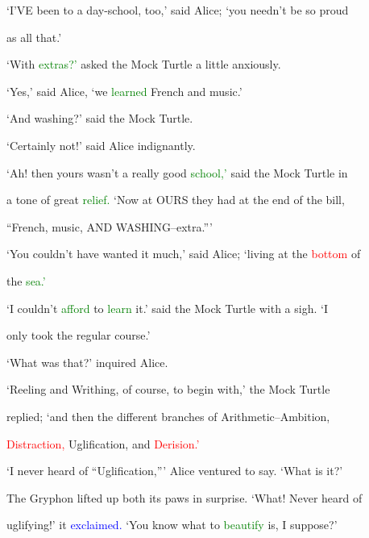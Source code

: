  ‘I’VE been to a day-school, too,’ said Alice; ‘you needn’t be so \textcolor{BurntOrange}{proud}

 as all that.’



 ‘With \textcolor{green}{extras?’} asked the Mock Turtle a little anxiously.



 ‘Yes,’ said Alice, ‘we \textcolor{green}{learned} French and \textcolor{BurntOrange}{music.’}



 ‘And washing?’ said the Mock Turtle.



 ‘Certainly not!’ said Alice indignantly.



 ‘Ah! then yours wasn’t a really \textcolor{BurntOrange}{good} \textcolor{green}{school,’} said the Mock Turtle in

 a tone of great \textcolor{green}{relief.} ‘Now at OURS they had at the end of the bill,

 “French, \textcolor{BurntOrange}{music,} AND WASHING--extra.”’



 ‘You couldn’t have wanted it much,’ said Alice; ‘living at the \textcolor{red}{bottom} of

 the \textcolor{green}{sea.’}



 ‘I couldn’t \textcolor{green}{afford} to \textcolor{green}{learn} it.’ said the Mock Turtle with a sigh. ‘I

 only took the regular course.’



 ‘What was that?’ inquired Alice.



 ‘Reeling and Writhing, of course, to begin with,’ the Mock Turtle

 replied; ‘and then the different branches of Arithmetic--Ambition,

 \textcolor{red}{Distraction,} Uglification, and \textcolor{red}{Derision.’}



 ‘I never heard of “Uglification,”’ Alice ventured to say. ‘What is it?’



 The Gryphon lifted up both its paws in \textcolor{BurntOrange}{surprise.} ‘What! Never heard of

 uglifying!’ it \textcolor{blue}{exclaimed.} ‘You know what to \textcolor{green}{beautify} is, I suppose?’




